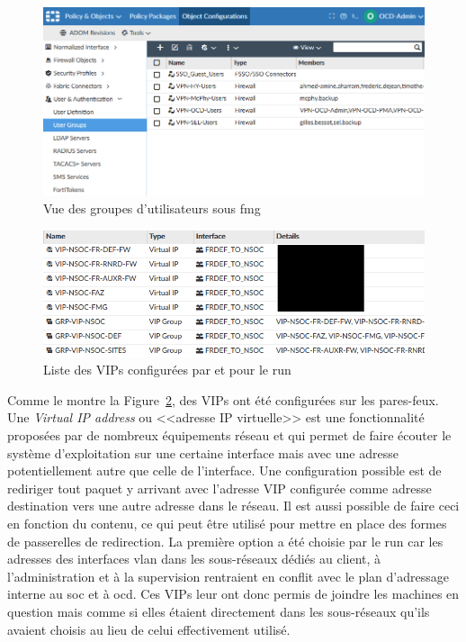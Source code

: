 \documentclass[12pt, oneside, a4paper, titlepage]{report}
\begin{document}
\begin{figure}[h!]
    \centering
    \includegraphics[width = \linewidth]{img/fmg/user-groups.png}
    \caption{Vue des groupes d'utilisateurs sous \acrlong{fmg}}%
    \label{fig:fmg/user-groups}
\end{figure}

\begin{figure}[h!]
    \centering
    \includegraphics[width = \linewidth]{img/fmg/vips.png}
    \caption{Liste des VIPs configurées par et pour le \gls{run}}%
    \label{fig:fmg/vips.png}
\end{figure}

Comme le montre la Figure~\ref{fig:fmg/vips.png}, des VIPs ont été configurées
sur les pares-feux. Une \textit{Virtual IP address} ou <<adresse IP virtuelle>>
est une fonctionnalité proposées par de nombreux équipements réseau et qui
permet de faire écouter le système d'exploitation sur une certaine interface
mais avec une adresse potentiellement autre que celle de l'interface. Une
configuration possible est de rediriger tout paquet y arrivant avec l'adresse
VIP configurée comme adresse destination vers une autre adresse dans le réseau.
Il est aussi possible de faire ceci en fonction du contenu, ce qui peut être
utilisé pour mettre en place des formes de passerelles de redirection. La
première option a été choisie par le \gls{run} car les adresses des interfaces
\gls{vlan} dans les sous-réseaux dédiés au client, à l'administration et à la
supervision rentraient en conflit avec le plan d'adressage interne au \gls{soc}
et à \gls{ocd}. Ces VIPs leur ont donc permis de joindre les machines en
question mais comme si elles étaient directement dans les sous-réseaux qu'ils
avaient choisis au lieu de celui effectivement utilisé.
\end{document}
